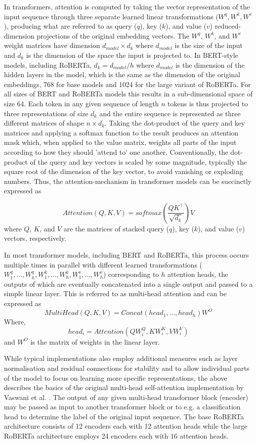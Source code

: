 \documentclass[12pt]{report}
\begin{document}
In transformers, attention is computed by taking the vector representation of the input sequence through three separate learned linear transformations ($W^q, W^k, W^v$), producing what are referred to as query ($q$), key ($k$), and value ($v$) reduced-dimension projections of the original embedding vectors.
The $W^q$, $W^k$, and $W^v$ weight matrices have dimension $d_{model} \times d_k$ where $d_{model}$ is the size of the input and $d_k$ is the dimension of the space the input is projected to.
In BERT-style models, including RoBERTa, $d_k = d_{model}/h$ where $d_{model}$ is the dimension of the hidden layers in the model, which is the same as the dimension of the original embeddings, 768 for base models and 1024 for the large variant of RoBERTa.
For all sizes of BERT and RoBERTa models this results in a sub-dimensional space of size 64.
Each token in any given sequence of length $n$ tokens is thus projected to three representations of size $d_k$ and the entire sequence is represented as three different matrices of shape $n \times d_k$.
Taking the dot-product of the query and key matrices and applying a softmax function to the result produces an attention mask which, when applied to the value matrix, weights all parts of the input according to how they should 'attend to' one another.
Conventionally, the dot-product of the query and key vectors is scaled by some magnitude, typically the square root of the dimension of the key vector, to avoid vanishing or exploding numbers.
Thus, the attention-mechanism in transformer models can be succinctly expressed as

$$Attention(Q,K,V) = softmax\left(\frac{QK^\intercal}{\sqrt{d_k}}\right)V$$
where $Q$, $K$, and $V$ are the matrices of stacked query ($q$), key ($k$), and value ($v$) vectors, respectively.

In most transformer models, including BERT and RoBERTa, this process occurs multiple times in parallel with different learned transformations ($W_1^q, \ldots, W_h^q, W_1^k, \ldots, W_h^k, W_1^v, \ldots, W_h^v$) corresponding to $h$ attention heads, the outputs of which are eventually concatenated into a single output and passed to a simple linear layer.
This is referred to as multi-head attention and can be expressed as
$$MultiHead(Q, K, V) = Concat(head_1, ..., head_h)W^O$$
Where, $$head_i = Attention(Q W^Q_i, K W^K_i, V W^V_i)$$
and $W^O$ is the matrix of weights in the linear layer.

While typical implementations also employ additional measures such as layer normalisation and residual connections for stability and to allow individual parts of the model to focus on learning more specific representations, the above describes the basics of the original multi-head self-attention implementation by Vaswani et al. \citeyear{Vaswani2017}.
The output of any given multi-head transformer block (encoder) may be passed as input to another transformer block or to e.g. a classification head to determine the label of the original input sequence.
The base RoBERTa architecture consists of 12 encoders each with 12 attention heads while the large RoBERTa architecture employs 24 encoders each with 16 attention heads.
\end{document}
